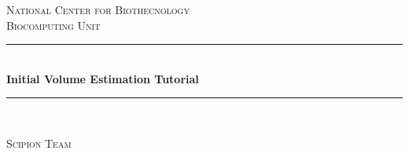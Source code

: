 \documentclass[12pt]{article} %
\begin{document}

\begin{titlepage}

\newcommand{\HRule}{\rule{\linewidth}{0.5mm}} %

\center %

\textsc{\LARGE National Center for Biothecnology}\\[1.5cm] %
\textsc{\Large Biocomputing Unit}\\[0.5cm] %

\HRule \\[0.4cm]
{ \huge \bfseries Initial Volume Estimation Tutorial}\\[0.4cm] %
\HRule \\[1.5cm]





\vfill %
\begin{flushright}
 \large
  \textsc{Scipion Team} %
\end{flushright}

\end{titlepage}
\end{document}
